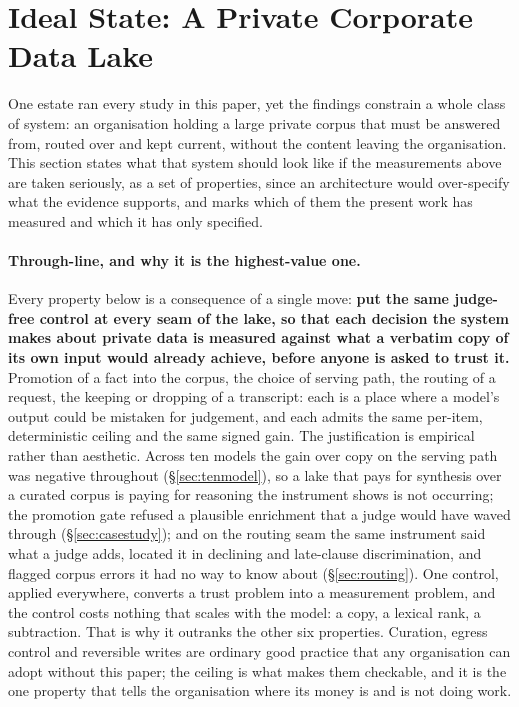 \section{Ideal State: A Private Corporate Data Lake}\label{sec:datalake}
One estate ran every study in this paper, yet the findings constrain a whole class of system: an organisation holding a large private corpus that must be answered from, routed over and kept current, without the content leaving the organisation. This section states what that system should look like if the measurements above are taken seriously, as a set of properties, since an architecture would over-specify what the evidence supports, and marks which of them the present work has measured and which it has only specified.

\paragraph{Through-line, and why it is the highest-value one.} Every property below is a consequence of a single move: \textbf{put the same judge-free control at every seam of the lake, so that each decision the system makes about private data is measured against what a verbatim copy of its own input would already achieve, before anyone is asked to trust it.} Promotion of a fact into the corpus, the choice of serving path, the routing of a request, the keeping or dropping of a transcript: each is a place where a model's output could be mistaken for judgement, and each admits the same per-item, deterministic ceiling and the same signed gain. The justification is empirical rather than aesthetic. Across ten models the gain over copy on the serving path was negative throughout (\S\ref{sec:tenmodel}), so a lake that pays for synthesis over a curated corpus is paying for reasoning the instrument shows is not occurring; the promotion gate refused a plausible enrichment that a judge would have waved through (\S\ref{sec:casestudy}); and on the routing seam the same instrument said what a judge adds, located it in declining and late-clause discrimination, and flagged corpus errors it had no way to know about (\S\ref{sec:routing}). One control, applied everywhere, converts a trust problem into a measurement problem, and the control costs nothing that scales with the model: a copy, a lexical rank, a subtraction. That is why it outranks the other six properties. Curation, egress control and reversible writes are ordinary good practice that any organisation can adopt without this paper; the ceiling is what makes them checkable, and it is the one property that tells the organisation where its money is and is not doing work.

